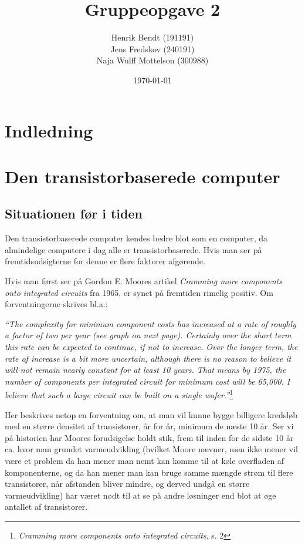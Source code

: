 \documentclass[10pt,a4paper]{article}
\title{Gruppeopgave 2}
\author{Henrik Bendt (191191)\\Jens Fredskov (240191)\\Naja Wulff Mottelson (300988)}
\date{\today}
\newcommand{\citat}[2]{\begin{justify}\textit{``#1''}\hspace{0.1cm}\footnote{#2}\end{justify}}
\begin{document}
\maketitle

\section{Indledning}


\section{Den transistorbaserede computer}
\subsection{Situationen før i tiden}
Den transistorbaserede computer kendes bedre blot som en computer, da almindelige computere i dag alle er transistorbaserede. Hvis man ser på fremtidsudsigterne for denne er flere faktorer afgørende.

Hvis man først ser på Gordon E. Moores artikel \textit{Cramming more components onto integrated circuits} fra 1965, er synet på fremtiden rimelig positiv. Om forventningerne skrives bl.a.:
\citat{The complexity for minimum component costs has increased at a rate of roughly a factor of two per year (see graph on next page). Certainly over the short term this rate can be expected to continue, if not to increase. Over the longer term, the rate of increase is a bit more uncertain, although there is no reason to believe it will not remain nearly constant for at least 10 years. That means by 1975, the number of components per integrated circuit for minimum cost will be 65,000. I believe that such a large circuit can be built on a single wafer.}{\textit{Cramming more components onto integrated circuits}, s. 2}

Her beskrives netop en forventning om, at man vil kunne bygge billigere kredsløb med en større densitet af transistorer, år for år, minimum de næste 10 år. Ser vi på historien har Moores forudsigelse holdt stik, frem til inden for de sidste 10 år ca. hvor man grundet varmeudvikling (hvilket Moore nævner, men ikke mener vil være et problem da han mener man nemt kan komme til at køle overfladen af komponenterne, og da han mener man kan bruge samme mængde strøm til flere transistorer, når afstanden bliver mindre, og derved undgå en større varmeudvikling) har været nødt til at se på andre løsninger end blot at øge antallet af transistorer.
\end{document}
